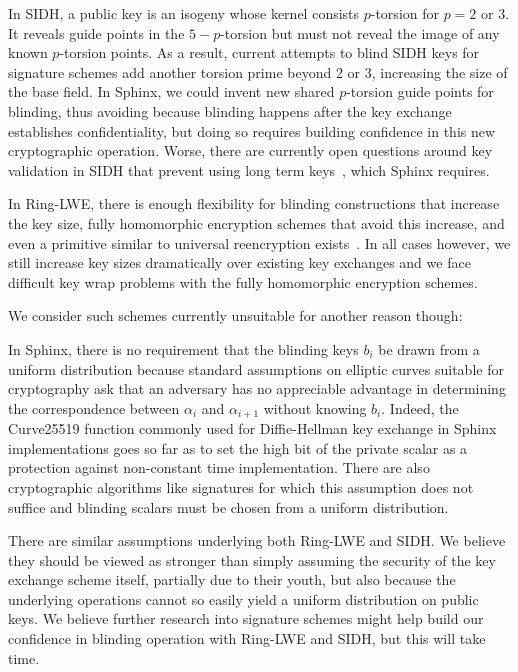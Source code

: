 \documentclass[twoside,letterpaper]{llncs}
\begin{document}
In SIDH, a public key is an isogeny whose kernel consists $p$-torsion
for $p=2$ or $3$.  It reveals guide points in the $5-p$-torsion but
must not reveal the image of any known $p$-torsion points.  
As a result, current attempts to blind SIDH keys for signature schemes
add another torsion prime beyond 2 or 3, increasing the size of the
base field.  In Sphinx, we could invent new shared $p$-torsion guide
points for blinding, thus avoiding
because blinding happens after the key exchange
establishes confidentiality, but doing so requires building confidence
in this new cryptographic operation.  Worse, there are currently open
questions around key validation in SIDH that prevent using long term
keys~\cite{SIDH-NoValidation}, which Sphinx requires.

In Ring-LWE, there is enough flexibility for blinding constructions
that increase the key size, fully homomorphic encryption schemes that
avoid this increase, and even a primitive similar to universal
reencryption exists~\cite{963628}.  In all cases however, we still
increase key sizes dramatically over existing key exchanges and we face
difficult key wrap problems with the fully homomorphic encryption
schemes.

We consider such schemes currently unsuitable for another reason though: 

In Sphinx, there is no requirement that the blinding keys $b_i$ be
drawn from a uniform distribution because standard assumptions on
elliptic curves suitable for cryptography ask that an adversary has
no appreciable advantage in determining the correspondence between
$\alpha_i$ and $\alpha_{i+1}$ without knowing $b_i$.  
Indeed, the Curve25519 function commonly used for Diffie-Hellman key
exchange in Sphinx implementations goes so far as to set the high bit
of the private scalar as a protection against non-constant time
implementation.
There are also cryptographic algorithms like signatures for which
this assumption does not suffice and blinding scalars must be chosen
from a uniform distribution.

There are similar assumptions underlying both Ring-LWE and SIDH.
We believe they should be viewed as stronger than simply assuming the
security of the key exchange scheme itself, partially due to their
youth, but also because the underlying operations cannot so easily
yield a uniform distribution on public keys.  We believe further
research into signature schemes might help build our confidence in
blinding operation with Ring-LWE and SIDH, but this will take time.
\end{document}
